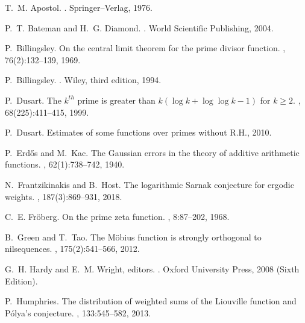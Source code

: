 \documentclass[11pt,reqno,a4letter]{article}
\numberwithin{equation}{section}
\numberwithin{figure}{section}
\numberwithin{table}{section}
\theoremstyle{plain}
\numberwithin{theorem}{section}
\theoremstyle{definition}
\begin{document}
\renewcommand{\refname}{References} 


\begin{thebibliography}{10}

T.~M. Apostol.
.
\newblock Springer--Verlag, 1976.

P.~T. Bateman and H.~G. Diamond.
.
\newblock World Scientific Publishing, 2004.

P.~Billingsley.
\newblock On the central limit theorem for the prime divisor function.
, 76(2):132--139, 1969.

P.~Billingsley.
.
\newblock Wiley, third edition, 1994.

P.~Dusart.
\newblock The $k^{th}$ prime is greater than $k(\log k +\log\log k-1)$ for $k
  \geq 2$.
, 68(225):411--415, 1999.

P.~Dusart.
\newblock Estimates of some functions over primes without {R}.{H}., 2010.

P.~Erd{\H{o}}s and M.~Kac.
\newblock The {G}aussian errors in the theory of additive arithmetic functions.
, 62(1):738--742, 1940.

N.~Frantzikinakis and B.~Host.
\newblock The logarithmic {S}arnak conjecture for ergodic weights.
, 187(3):869--931, 2018.

C.~E. Fr{\"{o}}berg.
\newblock On the prime zeta function.
, 8:87--202, 1968.

B.~Green and T.~Tao.
\newblock The {M}\"{o}bius function is strongly orthogonal to nilsequences.
, 175(2):541--566, 2012.

G.~H. Hardy and E.~M. Wright, editors.
.
\newblock Oxford University Press, 2008 (Sixth Edition).

P.~Humphries.
\newblock The distribution of weighted sums of the {L}iouville function and
  {P}\'{o}lya's conjecture.
, 133:545--582, 2013.


\end{thebibliography}
\end{document}
